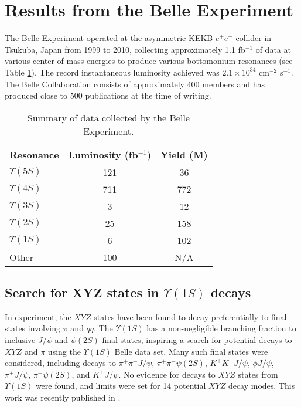 \documentclass[12pt]{article}
\begin{document}
\section{Results from the Belle Experiment}
The Belle Experiment operated at the asymmetric KEKB $e^{+}e^{-}$ collider in Tsukuba, Japan from 1999 to 2010, collecting approximately 1.1 fb$^{-1}$ of data at various center-of-mass energies to produce various bottomonium resonances (see Table \ref{tab:data}). The record instantaneous luminosity achieved was $2.1\times10^{34}$ cm$^{-2}$ s$^{-1}$. The Belle Collaboration consists of approximately 400 members and has produced close to 500 publications at the time of writing.

\begin{table}[b]
  \begin{center}
    \begin{tabular}{|l|c|c|}
      \hline Resonance & Luminosity (fb$^{-1}$) & Yield (M) \\
      \hline $\Upsilon(5S)$ & 121 & 36\\
      \hline $\Upsilon(4S)$ & 711 & 772\\
      \hline $\Upsilon(3S)$ & 3 & 12\\
      \hline $\Upsilon(2S)$ & 25 & 158\\
      \hline $\Upsilon(1S)$ & 6 & 102\\
      \hline Other & 100 & N/A\\
      \hline
    \end{tabular}
    \caption{Summary of data collected by the Belle Experiment.}
    \label{tab:data}
  \end{center}
\end{table}

\subsection{Search for XYZ states in $\Upsilon(1S)$ decays}
In experiment, the $XYZ$ states have been found to decay preferentially to final states involving $\pi$ and $q\overline{q}$. The $\Upsilon(1S)$ has a non-negligible branching fraction to inclusive $J/\psi$ and $\psi(2S)$ final states, inspiring a search for potential decays to $XYZ$ and $\pi$ using the $\Upsilon(1S)$ Belle data set. Many such final states were considered, including decays to $\pi^{+}\pi^{-}J/\psi$, $\pi^{+}\pi^{-}\psi(2S)$, $K^{+}K^{-}J/\psi$, $\phi J/\psi$, $\pi^{\pm}J/\psi$, $\pi^{\pm}\psi(2S)$, and $K^{\pm}J/\psi$. No evidence for decays to $XYZ$ states from $\Upsilon(1S)$ were found, and limits were set for 14 potential $XYZ$ decay modes. This work was recently published in \cite{xyz_1s}.
\end{document}
